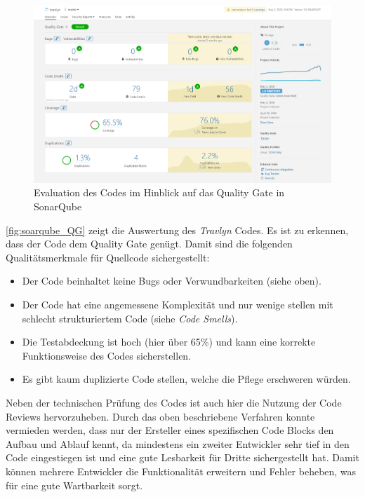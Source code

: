 	\begin{figure}[ht!]
		\centering
		\includegraphics[width=1\textwidth]{images/sonar_passed_QG.png}
		\caption{Evaluation des Codes im Hinblick auf das Quality Gate in SonarQube}
		\label{fig:soarqube_QG}
	\end{figure}

	\autoref{fig:soarqube_QG} zeigt die Auswertung des \textit{Travlyn} Codes. Es ist zu erkennen, dass der Code dem Quality Gate genügt. Damit sind die folgenden Qualitätsmerkmale für Quellcode sichergestellt:
	
	\begin{itemize}
		\item Der Code beinhaltet keine Bugs oder Verwundbarkeiten (siehe oben).
		\item Der Code hat eine angemessene Komplexität und nur wenige stellen mit schlecht strukturiertem Code (siehe \textit{Code Smells}).
		\item Die Testabdeckung ist hoch (hier über 65\%) und kann eine korrekte Funktionsweise des Codes sicherstellen.
		\item Es gibt kaum duplizierte Code stellen, welche die Pflege erschweren würden. 
	\end{itemize} 
	
	\newpage
	
	Neben der technischen Prüfung des Codes ist auch hier die Nutzung der Code Reviews hervorzuheben. Durch das oben beschriebene Verfahren konnte vermieden werden, dass nur der Ersteller eines spezifischen Code Blocks den Aufbau und Ablauf kennt, da mindestens ein zweiter Entwickler sehr tief in den Code eingestiegen ist und eine gute Lesbarkeit für Dritte sichergestellt hat. Damit können mehrere Entwickler die Funktionalität erweitern und Fehler beheben, was für eine gute Wartbarkeit sorgt.
	
